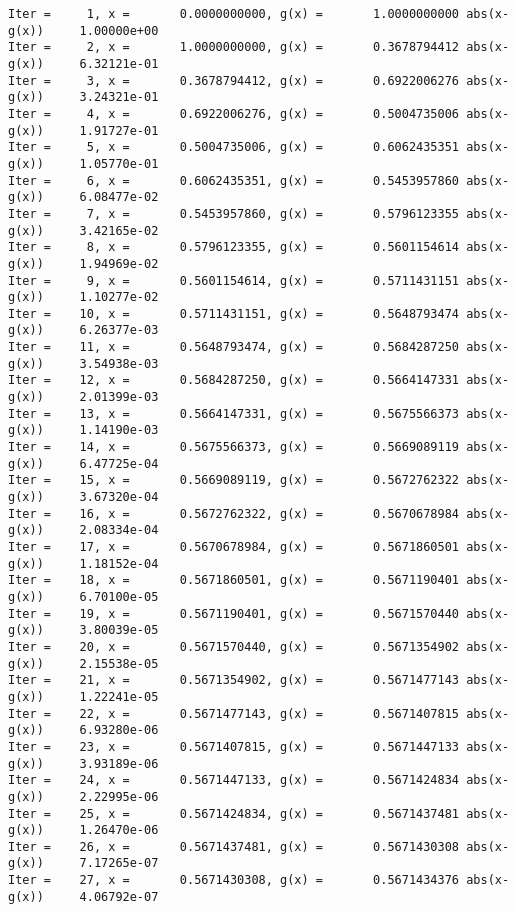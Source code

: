 \documentclass[11pt]{article}
\begin{document}
    \begin{Verbatim}[commandchars=\\\{\}]
Iter =     1, x =       0.0000000000, g(x) =       1.0000000000 abs(x-g(x))     1.00000e+00
Iter =     2, x =       1.0000000000, g(x) =       0.3678794412 abs(x-g(x))     6.32121e-01
Iter =     3, x =       0.3678794412, g(x) =       0.6922006276 abs(x-g(x))     3.24321e-01
Iter =     4, x =       0.6922006276, g(x) =       0.5004735006 abs(x-g(x))     1.91727e-01
Iter =     5, x =       0.5004735006, g(x) =       0.6062435351 abs(x-g(x))     1.05770e-01
Iter =     6, x =       0.6062435351, g(x) =       0.5453957860 abs(x-g(x))     6.08477e-02
Iter =     7, x =       0.5453957860, g(x) =       0.5796123355 abs(x-g(x))     3.42165e-02
Iter =     8, x =       0.5796123355, g(x) =       0.5601154614 abs(x-g(x))     1.94969e-02
Iter =     9, x =       0.5601154614, g(x) =       0.5711431151 abs(x-g(x))     1.10277e-02
Iter =    10, x =       0.5711431151, g(x) =       0.5648793474 abs(x-g(x))     6.26377e-03
Iter =    11, x =       0.5648793474, g(x) =       0.5684287250 abs(x-g(x))     3.54938e-03
Iter =    12, x =       0.5684287250, g(x) =       0.5664147331 abs(x-g(x))     2.01399e-03
Iter =    13, x =       0.5664147331, g(x) =       0.5675566373 abs(x-g(x))     1.14190e-03
Iter =    14, x =       0.5675566373, g(x) =       0.5669089119 abs(x-g(x))     6.47725e-04
Iter =    15, x =       0.5669089119, g(x) =       0.5672762322 abs(x-g(x))     3.67320e-04
Iter =    16, x =       0.5672762322, g(x) =       0.5670678984 abs(x-g(x))     2.08334e-04
Iter =    17, x =       0.5670678984, g(x) =       0.5671860501 abs(x-g(x))     1.18152e-04
Iter =    18, x =       0.5671860501, g(x) =       0.5671190401 abs(x-g(x))     6.70100e-05
Iter =    19, x =       0.5671190401, g(x) =       0.5671570440 abs(x-g(x))     3.80039e-05
Iter =    20, x =       0.5671570440, g(x) =       0.5671354902 abs(x-g(x))     2.15538e-05
Iter =    21, x =       0.5671354902, g(x) =       0.5671477143 abs(x-g(x))     1.22241e-05
Iter =    22, x =       0.5671477143, g(x) =       0.5671407815 abs(x-g(x))     6.93280e-06
Iter =    23, x =       0.5671407815, g(x) =       0.5671447133 abs(x-g(x))     3.93189e-06
Iter =    24, x =       0.5671447133, g(x) =       0.5671424834 abs(x-g(x))     2.22995e-06
Iter =    25, x =       0.5671424834, g(x) =       0.5671437481 abs(x-g(x))     1.26470e-06
Iter =    26, x =       0.5671437481, g(x) =       0.5671430308 abs(x-g(x))     7.17265e-07
Iter =    27, x =       0.5671430308, g(x) =       0.5671434376 abs(x-g(x))     4.06792e-07

\end{Verbatim}
\end{document}
